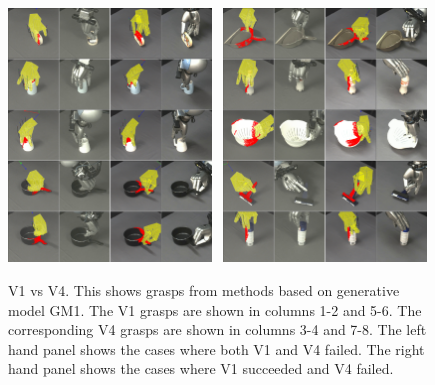 \begin{figure}
\begin{center}
\includegraphics[width=0.48\textwidth]{plots/A2fA9f_vertical.png}~
\includegraphics[width=0.48\textwidth]{plots/A2sA9f_vertical.png}
\caption{V1 vs V4. This shows grasps from methods based on generative model GM1. The V1 grasps are shown in columns 1-2 and 5-6. The corresponding V4 grasps are shown in columns 3-4 and 7-8. The left hand panel shows the cases where both V1 and V4 failed. The right hand panel shows the cases where V1 succeeded and V4 failed. \label{fig:v1fsv4f}}
\end{center}
\end{figure}


%
